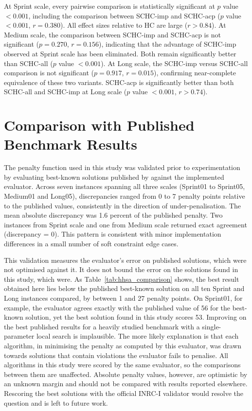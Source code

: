 \documentclass[12pt, a4paper, oneside]{report}
\begin{document}
At Sprint scale, every pairwise comparison is statistically
significant at $p$ value $< 0.001$, including the comparison between
SCHC-imp and SCHC-acp ($p$ value $< 0.001$, $r = 0.380$). All effect sizes
relative to HC are large ($r > 0.84$). At Medium scale, the
comparison between SCHC-imp and SCHC-acp is not significant ($p =
0.270$, $r = 0.156$), indicating that the advantage of SCHC-imp
observed at Sprint scale has been eliminated. Both remain
significantly better than SCHC-all ($p$ value $< 0.001$). At Long scale,
the SCHC-imp versus SCHC-all comparison is not significant ($p =
0.917$, $r = 0.015$), confirming near-complete equivalence of these
two variants. SCHC-acp is significantly better than both SCHC-all
and SCHC-imp at Long scale ($p$ value $< 0.001$, $r > 0.74$).



\section{Comparison with Published Benchmark Results}
\label{sec:validation}

The penalty function used in this study was validated prior to
experimentation by evaluating best-known solutions published by
\citet{Toffolo2014} against the implemented evaluator. Across seven
instances spanning all three scales (Sprint01 to Sprint05, Medium01
and Long05), discrepancies ranged from 0 to 7 penalty points relative
to the published values, consistently in the direction of
under-penalisation. The mean absolute discrepancy was 1.6 percent of
the published penalty. Two instances from Sprint scale and one from
Medium scale returned exact agreement (discrepancy = 0). This pattern
is consistent with minor implementation differences in a small number
of soft constraint edge cases.

This validation measures the evaluator's error on published
solutions, which were not optimised against it. It does not bound
the error on the solutions found in this study, which were. As
Table~\ref{tab:hhsa_comparison} shows, the best result obtained here
lies below the published best-known solution on all ten Sprint and
Long instances compared, by between 1 and 27 penalty points. On
Sprint01, for example, the evaluator agrees exactly with the
published value of 56 for the best-known solution, yet the best
solution found in this study scores 53. Improving on the best
published results for a heavily studied benchmark with a
single-parameter local search is implausible. The more likely
explanation is that each algorithm, in minimising the penalty as
computed by this evaluator, was drawn towards solutions that contain
violations the evaluator fails to penalise. All algorithms in this
study were scored by the same evaluator, so the comparisons between
them are unaffected. Absolute penalty values, however, are optimistic
by an unknown margin and should not be compared with results
reported elsewhere. Rescoring the best solutions with the official
INRC-I validator would resolve the question and is left to future
work.
\end{document}
